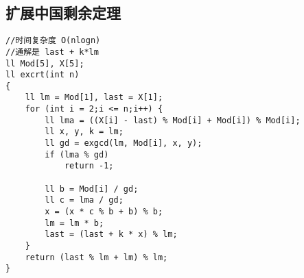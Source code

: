 \documentclass[twocolumn,a4]{article}
\begin{document}
\subsection{扩展中国剩余定理}
\begin{lstlisting}
//时间复杂度 O(nlogn)
//通解是 last + k*lm
ll Mod[5], X[5];
ll excrt(int n)
{
    ll lm = Mod[1], last = X[1];
    for (int i = 2;i <= n;i++) {
        ll lma = ((X[i] - last) % Mod[i] + Mod[i]) % Mod[i];
        ll x, y, k = lm;
        ll gd = exgcd(lm, Mod[i], x, y);
        if (lma % gd)
            return -1;

        ll b = Mod[i] / gd;
        ll c = lma / gd;
        x = (x * c % b + b) % b;
        lm = lm * b;
        last = (last + k * x) % lm;
    }
    return (last % lm + lm) % lm;
}
\end{lstlisting}
\end{document}
